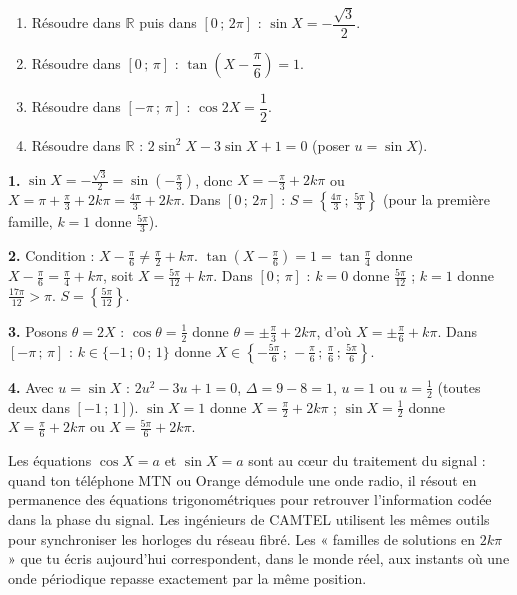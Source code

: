 \documentclass[11pt]{article}
\begin{document}
\begin{exercice}
\begin{enumerate}
\item Résoudre dans $\mathbb{R}$ puis dans $[0\,;\,2\pi]$ : $\sin X = -\dfrac{\sqrt3}{2}$.
\item Résoudre dans $[0\,;\,\pi]$ : $\tan\left(X - \dfrac{\pi}{6}\right) = 1$.
\item Résoudre dans $[-\pi\,;\,\pi]$ : $\cos 2X = \dfrac12$.
\item Résoudre dans $\mathbb{R}$ : $2\sin^2 X - 3\sin X + 1 = 0$ (poser $u = \sin X$).
\end{enumerate}
\end{exercice}

\begin{corrige}[Exercice]
\textbf{1.} $\sin X = -\frac{\sqrt3}{2} = \sin\left(-\frac{\pi}{3}\right)$, donc $X = -\frac{\pi}{3} + 2k\pi$ ou $X = \pi + \frac{\pi}{3} + 2k\pi = \frac{4\pi}{3} + 2k\pi$. Dans $[0\,;\,2\pi]$ : $S = \left\lbrace \frac{4\pi}{3}\,;\,\frac{5\pi}{3} \right\rbrace$ (pour la première famille, $k=1$ donne $\frac{5\pi}{3}$).

\textbf{2.} Condition : $X - \frac{\pi}{6} \neq \frac{\pi}{2} + k\pi$. $\tan\left(X - \frac{\pi}{6}\right) = 1 = \tan\frac{\pi}{4}$ donne $X - \frac{\pi}{6} = \frac{\pi}{4} + k\pi$, soit $X = \frac{5\pi}{12} + k\pi$. Dans $[0\,;\,\pi]$ : $k=0$ donne $\frac{5\pi}{12}$ ; $k=1$ donne $\frac{17\pi}{12} > \pi$. $S = \left\lbrace \frac{5\pi}{12} \right\rbrace$.

\textbf{3.} Posons $\theta = 2X$ : $\cos\theta = \frac12$ donne $\theta = \pm\frac{\pi}{3} + 2k\pi$, d'où $X = \pm\frac{\pi}{6} + k\pi$. Dans $[-\pi\,;\,\pi]$ : $k \in \{-1\,;\,0\,;\,1\}$ donne $X \in \left\lbrace -\frac{5\pi}{6}\,;\,-\frac{\pi}{6}\,;\,\frac{\pi}{6}\,;\,\frac{5\pi}{6} \right\rbrace$.

\textbf{4.} Avec $u = \sin X$ : $2u^2 - 3u + 1 = 0$, $\Delta = 9 - 8 = 1$, $u = 1$ ou $u = \frac12$ (toutes deux dans $[-1\,;\,1]$). $\sin X = 1$ donne $X = \frac{\pi}{2} + 2k\pi$ ; $\sin X = \frac12$ donne $X = \frac{\pi}{6} + 2k\pi$ ou $X = \frac{5\pi}{6} + 2k\pi$.
\end{corrige}

\begin{savaistu}
Les équations $\cos X = a$ et $\sin X = a$ sont au cœur du traitement du signal : quand ton téléphone MTN ou Orange démodule une onde radio, il résout en permanence des équations trigonométriques pour retrouver l'information codée dans la phase du signal. Les ingénieurs de CAMTEL utilisent les mêmes outils pour synchroniser les horloges du réseau fibré. Les « familles de solutions en $2k\pi$ » que tu écris aujourd'hui correspondent, dans le monde réel, aux instants où une onde périodique repasse exactement par la même position.
\end{savaistu}
\end{document}
